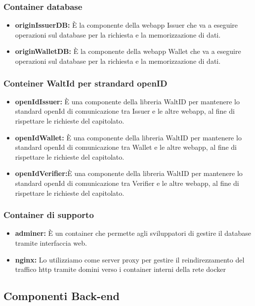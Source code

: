 \subsubsection{Container database}
\begin{itemize}
    \item \textbf{originIssuerDB:} È la componente della webapp Issuer che va a eseguire operazioni sul database per la richiesta e la memorizzazione di dati. 
    \item \textbf{originWalletDB:} È la componente della webapp Wallet che va a eseguire operazioni sul database per la richiesta e la memorizzazione di dati.
\end{itemize}

\subsubsection{Conteiner WaltId per strandard openID}
\begin{itemize}
    \item \textbf{openIdIssuer:} È una componente della libreria WaltID per mantenere lo standard openId di comunicazione tra Issuer e le altre webapp, al fine di rispettare le richieste del capitolato.
    \item \textbf{openIdWallet:} È una componente della libreria WaltID per mantenere lo standard openId di comunicazione tra Wallet e le altre webapp, al fine di rispettare le richieste del capitolato.
    \item \textbf{openIdVerifier:}È una componente della libreria WaltID per mantenere lo standard openId di comunicazione tra Verifier e le altre webapp, al fine di rispettare le richieste del capitolato.
\end{itemize}
 
\subsubsection{Container di supporto}
\begin{itemize}
    \item \textbf{adminer:} È un container che permette agli sviluppatori di gestire il database tramite interfaccia web.
    \item \textbf{nginx:} Lo utilizziamo come server proxy per gestire il reindirezzamento del traffico http tramite domini verso i container interni della rete docker
\end{itemize}


\subsection{Componenti Back-end}
